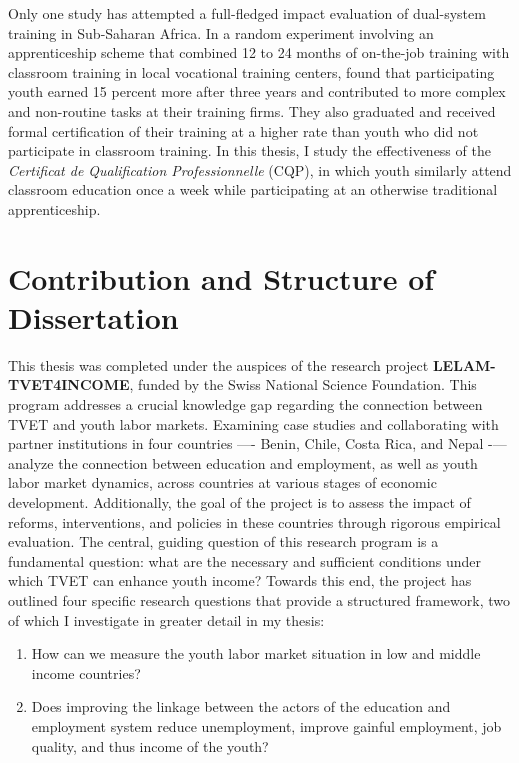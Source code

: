 \documentclass[
  a4paper, twoside, 12pt]{book}
\providecommand{\tightlist}{%
  \setlength{\itemsep}{0pt}\setlength{\parskip}{0pt}}
\begin{document}
Only one study has attempted a full-fledged impact evaluation of dual-system training in Sub-Saharan Africa. In a random experiment involving an apprenticeship scheme that combined 12 to 24 months of on-the-job training with classroom training in local vocational training centers, \textcite{crepon2019} found that participating youth earned 15 percent more after three years and contributed to more complex and non-routine tasks at their training firms. They also graduated and received formal certification of their training at a higher rate than youth who did not participate in classroom training. In this thesis, I study the effectiveness of the \emph{Certificat de Qualification Professionnelle} (CQP), in which youth similarly attend classroom education once a week while participating at an otherwise traditional apprenticeship.

\hypertarget{contribution-and-structure-of-dissertation}{%
\section{Contribution and Structure of Dissertation}\label{contribution-and-structure-of-dissertation}}

This thesis was completed under the auspices of the research project \textbf{LELAM-TVET4INCOME}, funded by the Swiss National Science Foundation. This program addresses a crucial knowledge gap regarding the connection between TVET and youth labor markets. Examining case studies and collaborating with partner institutions in four countries ---- Benin, Chile, Costa Rica, and Nepal -\/--- analyze the connection between education and employment, as well as youth labor market dynamics, across countries at various stages of economic development. Additionally, the goal of the project is to assess the impact of reforms, interventions, and policies in these countries through rigorous empirical evaluation. The central, guiding question of this research program is a fundamental question: what are the necessary and sufficient conditions under which TVET can enhance youth income? Towards this end, the project has outlined four specific research questions that provide a structured framework, two of which I investigate in greater detail in my thesis:

\begin{enumerate}
\def\labelenumi{\arabic{enumi}.}
\tightlist
\item
  How can we measure the youth labor market situation in low and middle income countries?
\item
  Does improving the linkage between the actors of the education and employment system reduce unemployment, improve gainful employment, job quality, and thus income of the youth?
\end{enumerate}
\end{document}
